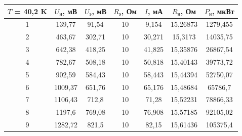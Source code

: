 \documentclass[a4paper, 12pt]{article} %
\begin{document}
\begin{center}
\begin{tabular}{|c|c|c|c|c|c|c|}
\hline
\textbf{$T$ = 40,2 K} & $U_\text{н}$, мВ & $U_\text{э}$, мВ & $R_\text{э}$, Ом & $I$, мА & $R_\text{н}$, Ом & $P_\text{н}$, мкВт \\ \hline
1                     & 139,77           & 91,54           & 10               & 9,154   & 15,26873         & 1279,455         \\ \hline
2                     & 463,67           & 302,71          & 10               & 30,271  & 15,3173          & 14035,75         \\ \hline
3                     & 642,38           & 418,25          & 10               & 41,825  & 15,35876         & 26867,54         \\ \hline
4                     & 782,67           & 508,18          & 10               & 50,818  & 15,40143         & 39773,72         \\ \hline
5                     & 902,59           & 584,43          & 10               & 58,443  & 15,44394         & 52750,07         \\ \hline
6                     & 1009,37          & 651,76          & 10               & 65,176  & 15,48684         & 65786,7          \\ \hline
7                     & 1106,43          & 712,8           & 10               & 71,28   & 15,52231         & 78866,33         \\ \hline
8                     & 1197,6           & 769,08          & 10               & 76,908  & 15,57185         & 92105,02         \\ \hline
9                     & 1282,72          & 821,5           & 10               & 82,15   & 15,61436         & 105375,4         \\ \hline
\end{tabular}
\end{center}
\end{document}
